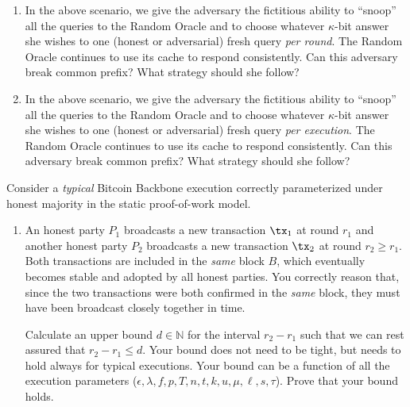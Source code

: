 \begin{problems}
\begin{enumerate}
            You do not need to concretely calculate the numerical values.

        \item In the above scenario, we give the adversary the fictitious
            ability to ``snoop'' all the queries to the Random Oracle and to choose
            whatever $\kappa$-bit answer she wishes to one (honest or adversarial) fresh
            query \emph{per round}. The Random Oracle continues to use its cache to
            respond consistently. Can this adversary break common prefix? What strategy
            should she follow?

        \item In the above scenario, we give the adversary the
            fictitious ability to ``snoop'' all the queries to the Random Oracle and to
            choose whatever $\kappa$-bit answer she wishes to one (honest or
            adversarial) fresh query \emph{per execution}. The Random Oracle continues
            to use its cache to respond consistently. Can this adversary break common
            prefix? What strategy should she follow?
        \end{enumerate}

        \item Consider a \emph{typical} Bitcoin Backbone execution correctly parameterized
            under honest majority in the static proof-of-work model.

            \begin{enumerate}
            \item An honest party $P_1$ broadcasts a new transaction $\tx_1$ at round $r_1$
                and another honest party $P_2$ broadcasts a new transaction $\tx_2$ at round
                $r_2 \geq r_1$. Both transactions are included in the \emph{same} block $B$,
                which eventually becomes stable and adopted by all honest parties. You
                correctly reason that, since the two transactions were both confirmed in the
                \emph{same} block, they must have been broadcast closely together in time.

                Calculate an upper bound $d \in \mathbb{N}$ for the interval $r_2 - r_1$
                such that we can rest assured that $r_2 - r_1 \leq d$. Your bound does not
                need to be tight, but needs to hold always for typical executions. Your
                bound can be a function of all the execution parameters ($\epsilon, \lambda,
                f, p, T, n, t, k, u, \mu, \ell, s, \tau$). Prove that your bound holds.


\end{enumerate}
\end{problems}
